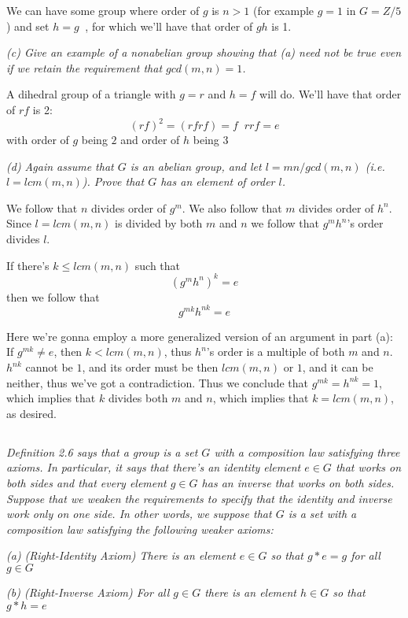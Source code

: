 \documentclass[11pt,oneside,titlepage]{book}
\DeclareMathOperator \inv {^{-1}}
\begin{document}
We can have some group where order of $g$ is $n > 1$ (for example $g =
1$ in $G = Z/5$) and set $h = g\inv$, for which we'll have that order
of $gh$ is 1.

\textit{(c) Give an example of a nonabelian group showing that (a) need not
  be true even if we retain the requirement that $gcd(m, n) = 1$.}

A dihedral group of a triangle with $g = r$ and $h = f$ will do. We'll have that
order of $rf$ is 2:
$$(rf)^2 = (rfrf) = f\inv r r f = e$$
with order of $g$ being $2$ and order of $h$ being $3$

\textit{(d) Again assume that $G$ is an abelian group, and let $l = mn
  / gcd(m, n)$ (i.e.  $l = lcm(m, n)$). Prove that $G$ has an element
  of order $l$.}

We follow that $n$ divides order of $g^m$. We also follow that $m$
divides order of $h^n$.  Since $l = lcm(m, n)$ is divided by both $m$
and $n$ we follow that $g^m h^n$'s order divides $l$.

If there's $k \leq lcm(m, n)$ such that
$$(g^m h^n)^k = e$$
then we follow that
$$g^{mk} h^{nk} = e$$

Here we're gonna employ a more generalized version of an argument in part (a):
If $g^{mk} \neq e$, then $k < lcm(m, n)$, thus  $h^{n}$'s order is a
multiple of both $m$ and $n$. $h^{nk}$ cannot be $1$, and its order
must be then $lcm(m, n)$ or $1$, and it can be neither, thus we've got
a contradiction. Thus we conclude that $g^{mk} = h^{nk} = 1$, which implies that $k$
divides both $m$ and $n$, which implies that $k = lcm(m, n)$, as desired.

\subsection{}

\textit{Definition 2.6 says that a group is a set $G$ with a
composition law satisfying three axioms.  In particular, it says that
there's an identity element $e \in G$ that works on both sides and
that every element $g \in G$ has an inverse that works on both
sides. Suppose that we weaken the requirements to specify that the
identity and inverse work only on one side. In other words, we suppose
that $G$ is a set with a composition law satisfying the following
weaker axioms: }

\textit{(a) (Right-Identity Axiom) There is an element $e \in G$ so
  that $g * e = g$ for all $g \in G$}

\textit{(b) (Right-Inverse Axiom) For all $g \in G$ there is an
  element $h \in G$ so that $g * h = e$}
\end{document}
